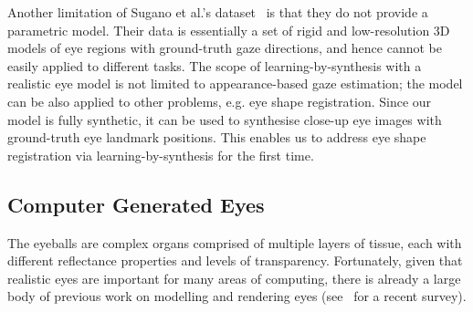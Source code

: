 Another limitation of Sugano et al.'s dataset~\cite{sugano2014learning} is that they do not provide a parametric model.
Their data is essentially a set of rigid and low-resolution 3D models of eye regions with ground-truth gaze directions, and hence cannot be easily applied to different tasks.
The scope of learning-by-synthesis with a realistic eye model is not limited to appearance-based gaze estimation; the model can be also applied to other problems, e.g. eye shape registration.
Since our model is fully synthetic, it can be used to synthesise close-up eye images with ground-truth eye landmark positions.
This enables us to address eye shape registration via learning-by-synthesis for the first time.



\subsection{Computer Generated Eyes}



The eyeballs are complex organs comprised of multiple layers of tissue, each with different reflectance properties and levels of transparency.
Fortunately, given that realistic eyes are important for many areas of computing, there is already a large body of previous work on modelling and rendering eyes (see~\cite{ruhland2014look} for a recent survey).


